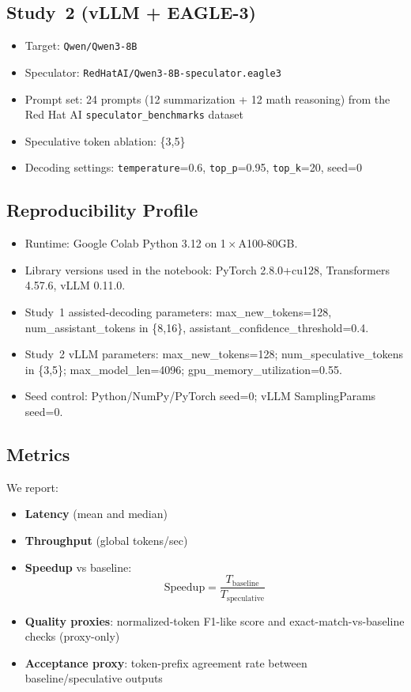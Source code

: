 \documentclass[11pt]{article}
\begin{document}
\subsection{Study~2 (vLLM + EAGLE-3)}
\begin{itemize}[leftmargin=1.2em]
    \item Target: \texttt{Qwen/Qwen3-8B}
    \item Speculator: \texttt{RedHatAI/Qwen3-8B-speculator.eagle3}
    \item Prompt set: 24 prompts (12 summarization + 12 math reasoning) from the Red Hat AI \texttt{speculator\_benchmarks} dataset
    \item Speculative token ablation: \{3,5\}
    \item Decoding settings: \texttt{temperature}=0.6, \texttt{top\_p}=0.95, \texttt{top\_k}=20, seed=0
\end{itemize}

\subsection{Reproducibility Profile}
\begin{itemize}[leftmargin=1.2em]
    \item Runtime: Google Colab Python 3.12 on 1\,$\times$\,A100-80GB.
    \item Library versions used in the notebook: PyTorch 2.8.0+cu128, Transformers 4.57.6, vLLM 0.11.0.
    \item Study~1 assisted-decoding parameters: max\_new\_tokens=128, num\_assistant\_tokens in \{8,16\}, assistant\_confidence\_threshold=0.4.
    \item Study~2 vLLM parameters: max\_new\_tokens=128; num\_speculative\_tokens in \{3,5\}; max\_model\_len=4096; gpu\_memory\_utilization=0.55.
    \item Seed control: Python/NumPy/PyTorch seed=0; vLLM SamplingParams seed=0.
\end{itemize}

\subsection{Metrics}
We report:
\begin{itemize}[leftmargin=1.2em]
    \item \textbf{Latency} (mean and median)
    \item \textbf{Throughput} (global tokens/sec)
    \item \textbf{Speedup} vs baseline:
    \begin{equation}
        \text{Speedup} = \frac{T_{\text{baseline}}}{T_{\text{speculative}}}
    \end{equation}
    \item \textbf{Quality proxies}: normalized-token F1-like score and exact-match-vs-baseline checks (proxy-only)
    \item \textbf{Acceptance proxy}: token-prefix agreement rate between baseline/speculative outputs
\end{itemize}
\end{document}
